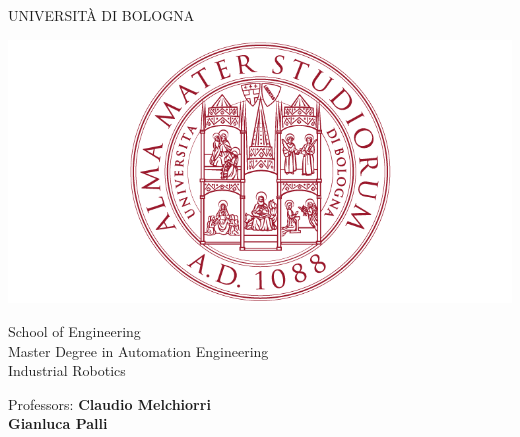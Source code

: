 \documentclass[a4paper,11pt,oneside]{book}
\begin{document}
			\pagestyle{myheadings}
			
			\thispagestyle{empty}                                                 
			\begin{center}                                                            
			    \vspace{5mm}
			    {\LARGE UNIVERSIT\`A DI BOLOGNA} \\                       
			      \vspace{5mm}
			\end{center}
			\begin{center}
			  \includegraphics[scale=.27]{figs/logo_unibo}
			\end{center}
			\begin{center}
			      \vspace{5mm}
			      {\LARGE School of Engineering} \\
			        \vspace{3mm}
			      {\Large Master Degree in Automation Engineering} \\
			      \vspace{20mm}
			      {\LARGE Industrial Robotics} \\
			      \vspace{15mm}
			\end{center}
			\begin{flushleft}                                                                              
			     {\large Professors: \textbf{\@ Claudio Melchiorri}\\  \hspace{20mm} \textbf{\@ Gianluca Palli}} \\  
			     
			      \vspace{13mm}
			\end{flushleft}
\end{document}
